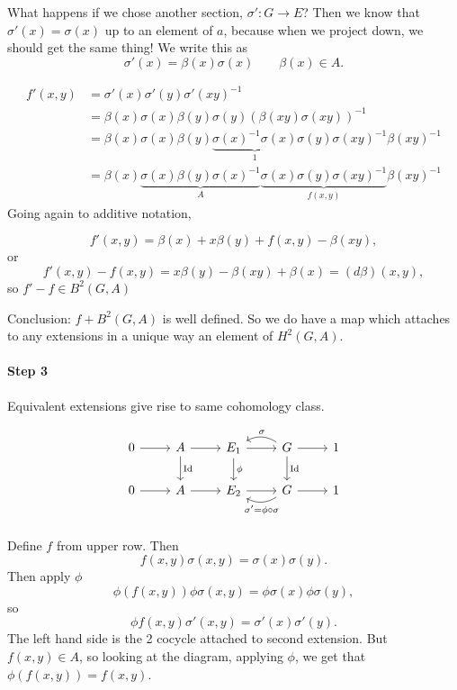 What happens if we chose another section, $\sigma' : G \to  E$?
Then we know that $\sigma'(x) = \sigma(x)$ up to an element of  $a$, because when we project down, we should get the same thing! We write this as
 \[
     \sigma'(x) = \beta(x) \sigma(x) \qquad \beta(x) \in A
.\] 

\begin{align*}
    f'(x,y) &= \sigma'(x) \sigma'(y) \sigma'(xy)^{-1}\\
            &= \beta(x) \sigma(x) \beta(y) \sigma(y) (\beta(xy) \sigma(xy))^{-1}\\
            &= \beta(x) \sigma(x) \beta(y) \underbrace{\sigma(x)^{-1} \sigma(x)}_{1} \sigma(y) \sigma(xy) ^{-1} \beta(xy)^{-1}\\
            &= \beta(x) \underbrace{\sigma(x) \beta(y) \sigma(x)^{-1}}_{A} \underbrace{\sigma(x) \sigma(y) \sigma(xy) ^{-1}}_{f(x,y)} \beta(xy)^{-1}
\end{align*}
Going again to additive notation,

\[
    f'(x,y) = \beta(x) + x \beta(y) + f(x,y) - \beta(xy)
,\] 
or
\[
    f'(x,y) -f(x,y) = x\beta(y) - \beta(xy) + \beta(x) = (d\beta)(x,y)
,\] 
so $f' - f \in B^2(G, A)$

Conclusion: $f + B^2(G, A)$ is well defined.
So we do have a map which attaches to any extensions in a unique way an element of $H^2(G, A)$.
\paragraph{Step 3}
Equivalent extensions give rise to same cohomology class.

\[
    \begin{tikzcd}
        0 \arrow[r, ""] 
        & A \arrow[r, ""] \arrow[d, "\operatorname{Id}"]
        & E_1 \arrow[r, ""] \arrow[d, "\phi"]
        & G \arrow[r, ""] \arrow[d, "\operatorname{Id}"] \arrow[l, "\sigma", bend right, swap]
        & 1 \\
        0 \arrow[r, ""] 
        & A \arrow[r, ""]
        & E_2 \arrow[r, ""]
        & G \arrow[r, ""] \arrow[l, "\sigma' = \phi  \circ  \sigma", bend left]
        & 1 \\
    \end{tikzcd}
\]

Define $f$ from upper row.
Then 
\[
    f(x,y) \sigma(x,y) = \sigma(x) \sigma(y)
.\] 
Then apply $\phi$
\[
    \phi(f(x,y)) \phi\sigma(x,y) = \phi\sigma(x) \phi\sigma(y)
,\] 
so
\[
    \phi f(x,y) \sigma'(x,y) = \sigma'(x) \sigma'(y)
.\] 
The left hand side is the 2 cocycle attached to second extension.
But $f(x,y) \in A$, so looking at the diagram, applying $\phi$, we get that  $\phi(f(x,y)) = f(x,y)$.


